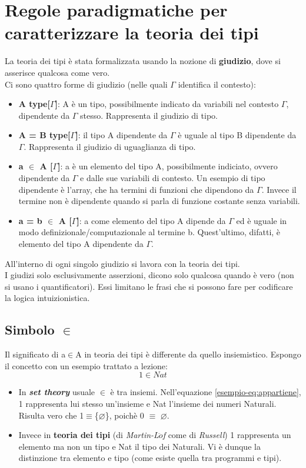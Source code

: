 \section{Regole paradigmatiche per caratterizzare la teoria dei tipi}
\label{sec:prime-regole-teoria-dei-tipi}
La teoria dei tipi \`e stata formalizzata usando la nozione di \textbf{giudizio}, dove si asserisce qualcosa come vero.\\
Ci sono quattro forme di giudizio (nelle quali $\Gamma$ identifica il contesto):
\begin{itemize}
\item \textbf{A type[$\Gamma$]}: A \`e un tipo, possibilmente indicato da variabili nel contesto $\Gamma$, dipendente da $\Gamma$ stesso. Rappresenta il giudizio di tipo.
\item \textbf{A = B type[$\Gamma$]}: il tipo A dipendente da $\Gamma$ \`e uguale al tipo B dipendente da $\Gamma$. Rappresenta il giudizio di uguaglianza di tipo.
\item \textbf{a $\in$ A [$\Gamma$]}: a \`e un elemento del tipo A, possibilmente indiciato, ovvero dipendente da $\Gamma$ e dalle sue variabili di contesto. Un esempio di tipo dipendente \`e l'array, che ha termini di funzioni che dipendono da $\Gamma$. Invece il termine non \`e dipendente quando si parla di funzione costante senza variabili.
\item \textbf{a = b $\in$ A [$\Gamma$]}: a come elemento del tipo A dipende da $\Gamma$ ed \`e uguale in modo definizionale/computazionale al termine b. Quest'ultimo, difatti, \`e elemento del tipo A dipendente da $\Gamma$.
\end{itemize}
\noindent
All'interno di ogni singolo giudizio si lavora con la teoria dei tipi.\\
I giudizi solo esclusivamente asserzioni, dicono solo qualcosa quando \`e vero (non si usano i quantificatori). Essi limitano le frasi che si possono fare per codificare la logica intuizionistica. 
\subsection{Simbolo $\in$}
\label{subsec:simbolo-appartiene}
Il significato di a$\in$A in teoria dei tipi \`e differente da quello insiemistico. Espongo il concetto con un esempio trattato a lezione:
\begin{equation}
1 \in Nat \label{esempio-eq:appartiene}
\end{equation}


\begin{itemize}
\item In \textbf{\textit{set theory}} usuale $\in$ \`e tra insiemi. Nell'equazione \ref{esempio-eq:appartiene}, 1 rappresenta lui stesso un'insieme e Nat l'insieme dei numeri Naturali.
Risulta vero che 1$\equiv$\{$\varnothing$\}, poich\`e 0 $\equiv$ $\varnothing$.
\item Invece in \textbf{teoria dei tipi} (di \textit{Martin-L$\ddot{o}$f} come di \textit{Russell})
1 rappresenta un elemento ma non un tipo e Nat il tipo dei Naturali. Vi \`e dunque la distinzione tra elemento e tipo (come esiste quella tra programmi e tipi).
\end{itemize}
